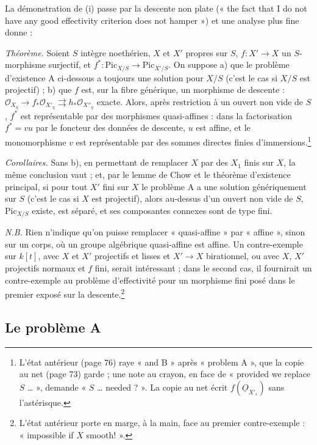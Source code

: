 \documentclass[11pt,a4paper]{article}
\begin{document}
La démonstration de (i) passe par la descente non plate (« the fact that I
do not have any good effectivity criterion does not hamper ») et une analyse
plus fine donne :

\emph{Théorème.} Soient $S$ intègre noethérien, $X$ et $X'$ propres sur $S$,
$f \colon X' \to X$ un $S$-morphisme surjectif, et
$f^* \colon \mathrm{Pic}_{X/S} \to \mathrm{Pic}_{X'/S}$. On suppose a) que le
problème d'existence A ci-dessous a toujours une solution pour $X/S$ (c'est le
cas si $X/S$ est projectif) ; b) que $f$ est, sur la fibre générique, un
morphisme de descente :
$\mathcal{O}_{X_\eta} \to f_*\mathcal{O}_{X'_\eta} \rightrightarrows h_*\mathcal{O}_{X''_\eta}$
exacte. Alors, après restriction à un ouvert non vide de $S$, $f^*$ est
représentable par des morphismes quasi-affines : dans la factorisation
$f^* = v u$ par le foncteur des données de descente, $u$ est affine, et le
monomorphisme $v$ est représentable par des sommes directes finies
d'immersions.\footnote{L'état antérieur (page 76) raye « and B » après
« problem A », que la copie au net (page 73) garde ; une note au crayon, en
face de « provided we replace $S$ … », demande « $S$ … needed ? ». La copie au
net écrit $f(\underline{O}_{X'_s})$ sans l'astérisque.}

\emph{Corollaires.} Sans b), en permettant de remplacer $X$ par des $X_1$ finis
sur $X$, la même conclusion vaut ; et, par le lemme de Chow et le théorème
d'existence principal, si pour tout $X'$ fini sur $X$ le problème A a une
solution génériquement sur $S$ (c'est le cas si $X$ est projectif), alors
au-dessus d'un ouvert non vide de $S$, $\mathrm{Pic}_{X/S}$ existe, est séparé,
et ses composantes connexes sont de type fini.

\emph{N.B.} Rien n'indique qu'on puisse remplacer « quasi-affine » par
« affine », sinon sur un corps, où un groupe algébrique quasi-affine est
affine. Un contre-exemple sur $k[t]$, avec $X$ et $X'$ projectifs et lisses et
$X' \to X$ birationnel, ou avec $X$, $X'$ projectifs normaux et $f$ fini, serait
intéressant ; dans le second cas, il fournirait un contre-exemple au problème
d'effectivité pour un morphisme fini posé dans le premier exposé sur la
descente.\footnote{L'état antérieur porte en marge, à la main, face au premier
contre-exemple : « impossible if $X$ smooth! ».}

\subsection*{Le problème A}
\end{document}
